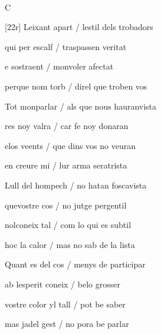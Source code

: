\documentclass[12pt]{article}
\renewcommand{\espaiAbansEtiquetaPoema}{\vspace{0ex}}
\begin{document}
\begin{estrofa}

\espaiAbansEtiquetaPoema

\\

\begin{rubrica}

C

\end{rubrica}

\end{estrofa}


\begin{estrofa}

 [22r] Leixant apart / lestil dels trobadors

 qui per escalf / traspassen veritat

 e sostraent / monvoler afectat

 perque nom torb / direl que troben vos

 Tot monparlar / als que nous hauranvista

 res noy valra / car fe noy donaran

 elos veents / que dins vos no veuran

 en creure mi / lur arma seratrista

\end{estrofa}



\begin{estrofa}

 Lull del hompech / no hatan foscavista

 quevostre cos / no jutge pergentil

 nolconeix tal / com lo qui es subtil

 hoc la calor / mas no sab de la lista

 Quant es del cos / menys de participar

 ab lesperit coneix / belo grosser

 vostre color yl tall / pot be saber

 mas jadel gest / no pora be parlar

\end{estrofa}
\end{document}
